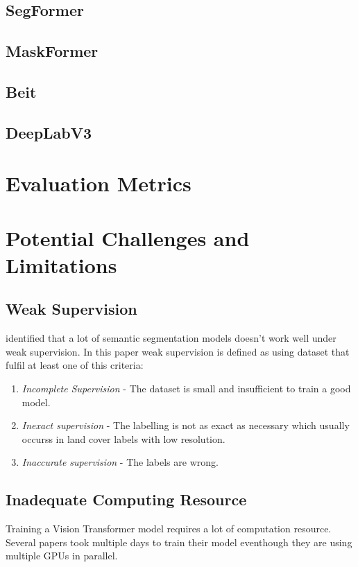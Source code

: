 \subsection{SegFormer}

\subsection{MaskFormer}

\subsection{Beit}

\subsection{DeepLabV3}
\section{Evaluation Metrics}
\section{Potential Challenges and Limitations}

\subsection{Weak Supervision}
\cite{weakly-supervised-semantic} identified that a lot of semantic segmentation models doesn't work well under weak supervision. In this paper weak supervision is defined as using dataset that fulfil at least one of this criteria:
\begin{enumerate}
    \item \textit{Incomplete Supervision} - The dataset is small and insufficient to train a good model.
    \item \textit{Inexact supervision} - The labelling is not as exact as necessary which usually occurss in land cover labels with low resolution.
    \item \textit{Inaccurate supervision} - The labels are wrong.
\end{enumerate}

\subsection{Inadequate Computing Resource}
Training a Vision Transformer model requires a lot of computation resource. Several papers took multiple days to train their model eventhough they are using multiple GPUs in parallel. 


